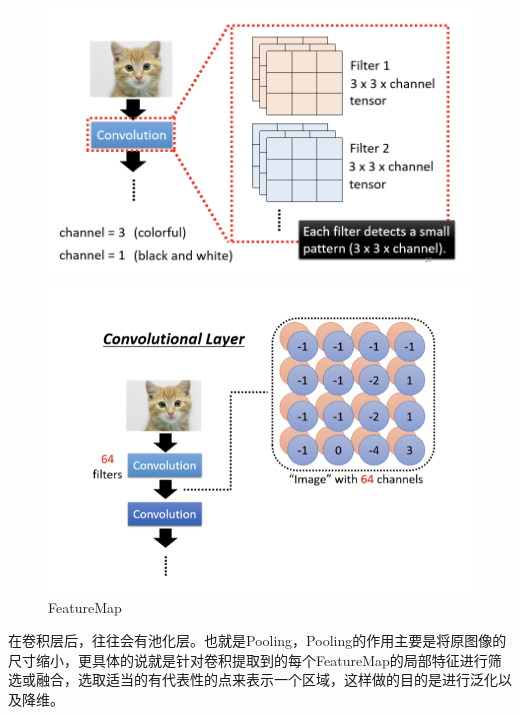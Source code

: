 \documentclass{article}
\begin{document}
\begin{figure}[H]
	\begin{minipage}[t]{0.5\linewidth}
		\centering
		\includegraphics[scale=0.4]{picture/FeatureMap1.png}
	\end{minipage}
    \quad
	\begin{minipage}[t]{0.5\linewidth}
		\centering
		\includegraphics[scale=0.5]{picture/FeatureMap2.png}
	\end{minipage}
	\caption{FeatureMap}
	\label{fig:galxy}
\end{figure}
\indent 在卷积层后，往往会有池化层。也就是Pooling，Pooling的作用主要是将原图像的尺寸缩小，更具体的说就是针对卷积提取到的每个FeatureMap的局部特征进行筛选或融合，选取适当的有代表性的点来表示一个区域，这样做的目的是进行泛化以及降维。 \par
\end{document}
